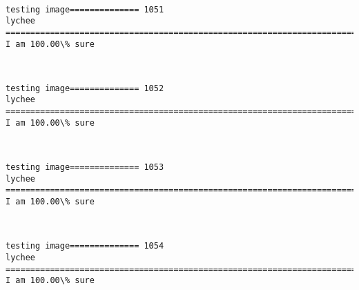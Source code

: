 \documentclass[11pt]{article}
\begin{document}
    \begin{center}
    \end{center}
    { \hspace*{\fill} \\}
    
    \begin{Verbatim}[commandchars=\\\{\}]
testing image============== 1051
lychee
============================================================================
I am 100.00\% sure

    \end{Verbatim}

    \begin{center}
    \end{center}
    { \hspace*{\fill} \\}
    
    \begin{Verbatim}[commandchars=\\\{\}]
testing image============== 1052
lychee
============================================================================
I am 100.00\% sure

    \end{Verbatim}

    \begin{center}
    \end{center}
    { \hspace*{\fill} \\}
    
    \begin{Verbatim}[commandchars=\\\{\}]
testing image============== 1053
lychee
============================================================================
I am 100.00\% sure

    \end{Verbatim}

    \begin{center}
    \end{center}
    { \hspace*{\fill} \\}
    
    \begin{Verbatim}[commandchars=\\\{\}]
testing image============== 1054
lychee
============================================================================
I am 100.00\% sure

    \end{Verbatim}
\end{document}
